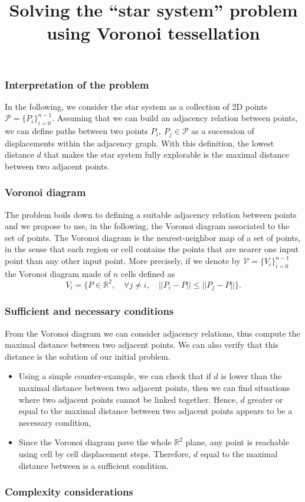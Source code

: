 \documentclass[11pt,a4paper]{article}
\title{Solving the ``star system'' problem using Voronoi tessellation}
\author{}
\begin{document}
% 

\subsubsection*{Interpretation of the problem} 

In the following, we consider the star system as a collection of 2D points $\mathcal{P} = \{P_i\}_{i=0}^{n-1}$. Assuming that we can build an adjacency relation between points, we can define paths between two points $P_i,~P_j \in \mathcal{P}$ as a succession of displacements within the adjacency graph. With this definition, the lowest distance $d$ that makes the star system fully explorable is the maximal distance between two adjacent points.

\subsubsection*{Voronoi diagram}

The problem boils down to defining a suitable adjacency relation between points and we propose to use, in the following, the Voronoi diagram associated to the set of points. The Voronoi diagram is the nearest-neighbor map of a set of points, in the sense that each region or cell contains the points that are nearer one input point than any other input point. More precisely, if we denote by $\mathcal{V} = \{V_i\}_{i=0}^{n-1}$ the Voronoi diagram made of $n$ cells defined as
\[
	V_i = \big\{ P \in \mathbb{R}^2,\quad \forall j \neq i,\quad  ||P_i - P|| \leq ||P_j - P|| \big\}.
\]

\subsubsection*{Sufficient and necessary conditions}

From the Voronoi diagram we can consider adjacency relations, thus compute the maximal distance between two adjacent points. We can also verify that this distance is the solution of our initial problem.

\begin{itemize}
	\item Using a simple counter-example, we can check that if $d$ is lower than the maximal distance between two adjacent points, then we can find situations where two adjacent points cannot be linked together. Hence, $d$ greater or equal to the maximal distance between two adjacent points appears to be a necessary condition,
	\item Since the Voronoi diagram pave the whole $\mathbb{R}^2$ plane, any point is reachable using cell by cell displacement steps. Therefore, $d$ equal to the maximal distance between is a sufficient condition.
\end{itemize}

\subsubsection*{Complexity considerations}







% 
\end{document}
